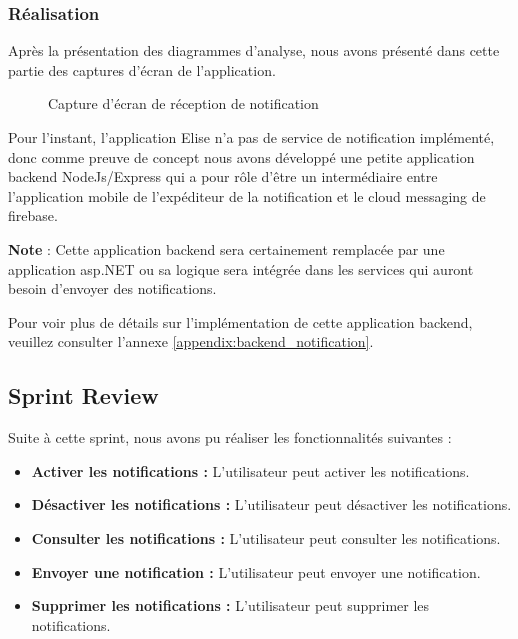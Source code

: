 \subsubsection{Réalisation}

Après la présentation des diagrammes d'analyse, nous avons présenté dans cette partie des captures d'écran de l'application.

\begin{figure}[H]
  \centering
  \caption{Capture d'écran de réception de notification}
  \label{fig:realisation_sprint8}
\end{figure}


Pour l'instant, l'application Elise n'a pas de service de notification implémenté, donc comme preuve de concept nous avons développé une petite application backend NodeJs/Express qui a pour rôle d'être un intermédiaire entre l'application mobile de l'expéditeur de la notification et le cloud messaging de firebase.

\textbf{Note} : Cette application backend sera certainement remplacée par une application asp.NET ou sa logique sera intégrée dans les services qui auront besoin d'envoyer des notifications.

Pour voir plus de détails sur l'implémentation de cette application backend, veuillez consulter l'annexe \ref{appendix:backend_notification}.




\subsection{Sprint Review}
Suite à cette sprint, nous avons pu réaliser les fonctionnalités suivantes :
\begin{itemize}
  \item \textbf{Activer les notifications :} L'utilisateur peut activer les notifications.
  \item \textbf{Désactiver les notifications :} L'utilisateur peut désactiver les notifications.
  \item \textbf{Consulter les notifications :} L'utilisateur peut consulter les notifications.
  \item \textbf{Envoyer une notification :} L'utilisateur peut envoyer une notification.
  \item \textbf{Supprimer les notifications :} L'utilisateur peut supprimer les notifications.
\end{itemize}

